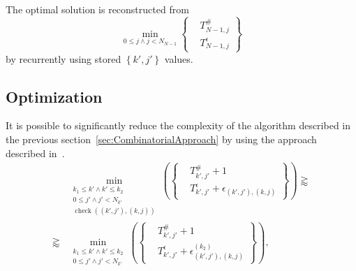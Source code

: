 \documentclass[conference]{IEEEtran}
\DeclareMathOperator{\functioncheck}{check}
\begin{document}
The optimal solution is reconstructed from
\begin{equation*}
  \min
  _
  {
    0 \leq j \wedge j < N_{N - 1}
  }
  {
    \left\{
      \begin{aligned}
        & T_{N - 1, j}^{\#}\\
        & T_{N - 1, j}^{\epsilon}
      \end{aligned}
    \right\}
  }
\end{equation*}
by recurrently using stored $\left\{ k', j' \right\}$ values.

\subsection
{
  Optimization
  \label{sec:Optimization}
}

It is possible to significantly reduce the complexity of the algorithm described in the previous section~\ref{sec:CombinatorialApproach} by using the approach described in~\cite{PolylineGeneralizationCombinatorical}.
\begin{equation}
  \begin{aligned}
    &
    \min
    _
    {
      \begin{aligned}
        k_1 \leq k' \wedge k' \leq k_2\\
        0 \leq j' \wedge j' < N_{k'}\\
        \functioncheck
        {
          \left(
            \left( k', j' \right),
            \left( k, j \right)
          \right)
        }
      \end{aligned}
    }
    {
      \left(
        \left\{
          \begin{aligned}
            & T_{k', j'}^{\#} + 1\\
            & T_{k', j'}^{\epsilon}
            +
            \epsilon
            _
            {
              \left( k', j' \right),
              \left( k, j \right)
            }
          \end{aligned}
        \right\}
      \right)
    }
    \gtrapprox
    \\
    \gtrapprox
    &
    \min
    _
    {
      \begin{aligned}
        k_1 \leq k' \wedge k' \leq k_2\\
        0 \leq j' \wedge j' < N_{k'}
      \end{aligned}
    }
    {
      \left(
        \left\{
          \begin{aligned}
            & T_{k', j'}^{\#} + 1\\
            & T_{k', j'}^{\epsilon}
            +
            \epsilon
            _
            {
              \left( k', j' \right),
              \left( k, j \right)
            }
            ^
            {
              \left( k_2 \right)
            }
          \end{aligned}
        \right\}
      \right)
    }
    ,
  \end{aligned}
  \label{eq:OptmizationBaseFormula}
\end{equation}
\end{document}
